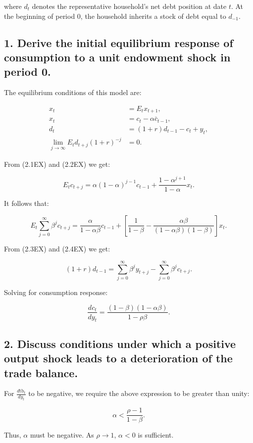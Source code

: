\documentclass{article}
\begin{document}
where $d_t$ denotes the representative household’s net debt position at date $t$. At the beginning of period 0, the household inherits a stock of debt equal to $d_{-1}$.

\subsection*{1. Derive the initial equilibrium response of consumption to a unit endowment shock in period 0.}

The equilibrium conditions of this model are:

\begin{align}
    x_t &= E_t x_{t+1}, \\
    x_t &= c_t - \alpha \bar{c}_{t-1}, \\
    d_t &= (1+r)d_{t-1} - c_t + y_t, \\
    \lim_{j \to \infty} E_t d_{t+j} (1+r)^{-j} &= 0.
\end{align}

From (2.1EX) and (2.2EX) we get:

\begin{equation}
    E_t c_{t+j} = \alpha (1 - \alpha)^{j-1} c_{t-1} + \frac{1 - \alpha^{j+1}}{1 - \alpha} x_t.
\end{equation}

It follows that:

\begin{equation}
    E_t \sum_{j=0}^{\infty} \beta^j c_{t+j} = \frac{\alpha}{1 - \alpha \beta} c_{t-1} + \left[\frac{1}{1-\beta} - \frac{\alpha \beta}{(1 - \alpha \beta)(1 - \beta)}\right] x_t.
\end{equation}

From (2.3EX) and (2.4EX) we get:

\begin{equation}
    (1+r)d_{t-1} = \sum_{j=0}^{\infty} \beta^j y_{t+j} - \sum_{j=0}^{\infty} \beta^j c_{t+j}.
\end{equation}

Solving for consumption response:

\begin{equation}
    \frac{d c_t}{d y_t} = \frac{(1 - \beta)(1 - \alpha \beta)}{1 - \rho \beta}.
\end{equation}

\subsection*{2. Discuss conditions under which a positive output shock leads to a deterioration of the trade balance.}

For $\frac{d \text{tb}_t}{d y_t}$ to be negative, we require the above expression to be greater than unity:

\begin{equation}
    \alpha < \frac{\rho - 1}{1 - \beta}.
\end{equation}

Thus, $\alpha$ must be negative. As $\rho \to 1$, $\alpha < 0$ is sufficient.
\end{document}
